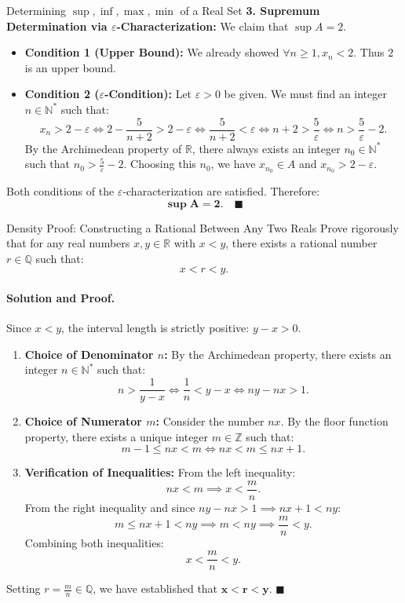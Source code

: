 \begin{workedexample}{Determining $\sup, \inf, \max, \min$ of a Real Set}
\textbf{3. Supremum Determination via $\varepsilon$-Characterization:}
We claim that $\sup A = 2$.
\begin{itemize}[leftmargin=1.4em,itemsep=2pt]
  \item \textbf{Condition 1 (Upper Bound):} We already showed $\forall n \ge 1, x_n < 2$. Thus $2$ is an upper bound.
  \item \textbf{Condition 2 ($\varepsilon$-Condition):} Let $\varepsilon > 0$ be given. We must find an integer $n \in \mathbb{N}^*$ such that:
  \[
  x_n > 2 - \varepsilon \iff 2 - \frac{5}{n + 2} > 2 - \varepsilon \iff \frac{5}{n + 2} < \varepsilon \iff n + 2 > \frac{5}{\varepsilon} \iff n > \frac{5}{\varepsilon} - 2.
  \]
  By the Archimedean property of $\mathbb{R}$, there always exists an integer $n_0 \in \mathbb{N}^*$ such that $n_0 > \frac{5}{\varepsilon} - 2$.
  Choosing this $n_0$, we have $x_{n_0} \in A$ and $x_{n_0} > 2 - \varepsilon$.
\end{itemize}
Both conditions of the $\varepsilon$-characterization are satisfied. Therefore:
\[
\mathbf{\sup A = 2}. \quad \blacksquare
\]
\end{workedexample}

\begin{workedexample}{Density Proof: Constructing a Rational Between Any Two Reals}
Prove rigorously that for any real numbers $x, y \in \mathbb{R}$ with $x < y$, there exists a rational number $r \in \mathbb{Q}$ such that:
\[
x < r < y.
\]

\paragraph{Solution and Proof.}
Since $x < y$, the interval length is strictly positive: $y - x > 0$.
\begin{enumerate}[leftmargin=1.4em,itemsep=3pt]
  \item \textbf{Choice of Denominator $n$:}
  By the Archimedean property, there exists an integer $n \in \mathbb{N}^*$ such that:
  \[
  n > \frac{1}{y - x} \iff \frac{1}{n} < y - x \iff n y - n x > 1.
  \]
  \item \textbf{Choice of Numerator $m$:}
  Consider the number $n x$. By the floor function property, there exists a unique integer $m \in \mathbb{Z}$ such that:
  \[
  m - 1 \le n x < m \iff n x < m \le n x + 1.
  \]
  \item \textbf{Verification of Inequalities:}
  From the left inequality:
  \[
  n x < m \implies x < \frac{m}{n}.
  \]
  From the right inequality and since $n y - n x > 1 \implies n x + 1 < n y$:
  \[
  m \le n x + 1 < n y \implies m < n y \implies \frac{m}{n} < y.
  \]
  Combining both inequalities:
  \[
  x < \frac{m}{n} < y.
  \]
\end{enumerate}
Setting $r = \frac{m}{n} \in \mathbb{Q}$, we have established that $\mathbf{x < r < y}$. $\blacksquare$
\end{workedexample}

